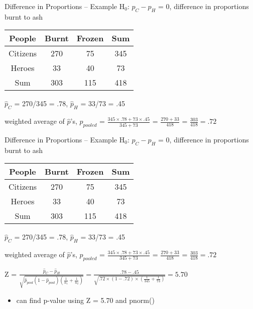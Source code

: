 \documentclass{beamer}
\begin{document}
\begin{frame}{Difference in Proportions -- Example}
H$_0$: $p_C - p_H$ = 0, difference in proportions burnt to ash
\vspace{4mm}


\begin{table}
    \centering
    \begin{tabular}{|c|c|c|c|}
    \hline
        People & Burnt & Frozen & Sum\\
        \hline
        Citizens & 270 & 75 & 345\\
        \hline
        Heroes & 33 & 40 & 73\\
        \hline
        Sum & 303 & 115 & 418\\
        \hline
    \end{tabular}
\end{table}

$\widehat{p}_C$ = 270/345 = .78, $\widehat{p}_H$ = 33/73 = .45 \vspace{2mm}

weighted average of $\hat{p}$'s, $\widehat{p}_{pooled}$ = $\frac{345\times.78 + 73\times.45}{345+73}$ = $\frac{270+33}{418}$ = $\frac{303}{418} = .72$

\end{frame}

\begin{frame}{Difference in Proportions -- Example}
H$_0$: $p_C - p_H$ = 0, difference in proportions burnt to ash
\vspace{4mm}


\begin{table}
    \centering
    \begin{tabular}{|c|c|c|c|}
    \hline
        People & Burnt & Frozen & Sum\\
        \hline
        Citizens & 270 & 75 & 345\\
        \hline
        Heroes & 33 & 40 & 73\\
        \hline
        Sum & 303 & 115 & 418\\
        \hline
    \end{tabular}
\end{table}

$\widehat{p}_C$ = 270/345 = .78, $\widehat{p}_H$ = 33/73 = .45 \vspace{2mm}

weighted average of $\hat{p}$'s, $\widehat{p}_{pooled}$ = $\frac{345\times.78 + 73\times.45}{345+73}$ = $\frac{270+33}{418}$ = $\frac{303}{418} = .72$ \vspace{4mm}

Z = $\frac{\widehat{p}_C - \widehat{p}_H}{\sqrt{\widehat{p}_{pool}(1-\widehat{p}_{pool})(\frac{1}{n_1}+\frac{1}{n_2})}} = \frac{.78 - .45}{\sqrt{.72\times(1-.72)\times(\frac{1}{345}+\frac{1}{73})}} = 5.70$
\begin{itemize}
    \item can find p-value using Z = 5.70 and pnorm()
\end{itemize}

\end{frame}
\end{document}
